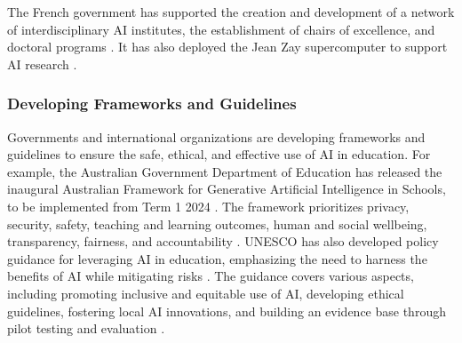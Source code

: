 \documentclass{article}
\begin{document}
The French government has supported the creation and development of a network of interdisciplinary AI institutes, the establishment of chairs of excellence, and doctoral programs \cite{https://www.entreprises.gouv.fr/fr/numerique/enjeux/la-strategie-nationale-pour-l-ia} \cite{https://www.enseignementsup-recherche.gouv.fr/fr/la-strategie-france-ia-soutenir-la-dynamique-francaise-autour-de-l-intelligence-artificielle-46305}. It has also deployed the Jean Zay supercomputer to support AI research \cite{https://www.entreprises.gouv.fr/fr/numerique/enjeux/la-strategie-nationale-pour-l-ia}.




\subsubsection{Developing Frameworks and Guidelines} %
Governments and international organizations are developing frameworks and guidelines to ensure the safe, ethical, and effective use of AI in education. For example, the Australian Government Department of Education has released the inaugural Australian Framework for Generative Artificial Intelligence in Schools, to be implemented from Term 1 2024 \cite{https://www.educationmattersmag.com.au/federal-government-releases-first-ai-framework-for-schools/}. The framework prioritizes privacy, security, safety, teaching and learning outcomes, human and social wellbeing, transparency, fairness, and accountability \cite{https://www.educationmattersmag.com.au/federal-government-releases-first-ai-framework-for-schools/}.
UNESCO has also developed policy guidance for leveraging AI in education, emphasizing the need to harness the benefits of AI while mitigating risks \cite{https://www.teachingtomorrow.co.uk/news/artificial-intelligence-in-education-empowering-teachers-and-students}. The guidance covers various aspects, including promoting inclusive and equitable use of AI, developing ethical guidelines, fostering local AI innovations, and building an evidence base through pilot testing and evaluation \cite{https://www.teachingtomorrow.co.uk/news/artificial-intelligence-in-education-empowering-teachers-and-students}.
\end{document}
